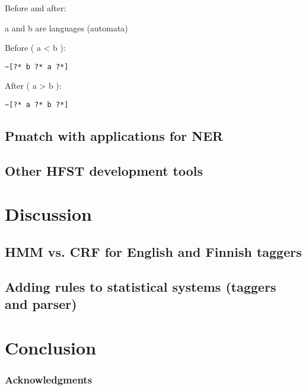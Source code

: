 \documentclass{llncs}
\begin{document}
Before and after:

a and b are languages (automata)

Before ( a < b ):

\begin{verbatim}
~[?* b ?* a ?*]
\end{verbatim}

After ( a > b ):

\begin{verbatim}
~[?* a ?* b ?*]
\end{verbatim}

\subsection{Pmatch with applications for NER}

\subsection{Other HFST development tools}

\section{Discussion}\label{hfst:discussion}

\subsection{HMM vs. CRF for English and Finnish taggers}

\subsection{Adding rules to statistical systems (taggers and parser)}

\section{Conclusion}\label{hfst:conclusion}

\subsubsection*{Acknowledgments}



\end{document}
